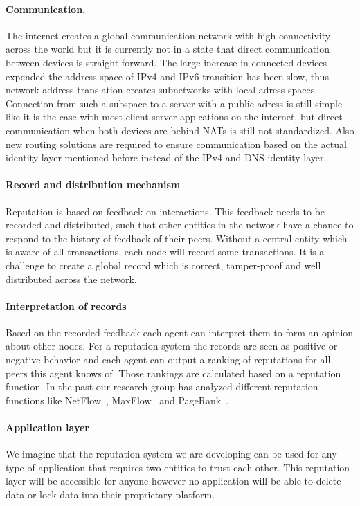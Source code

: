 \paragraph{Communication.} The internet creates a global communication network with high connectivity
across the world but it is currently not in a state that direct communication between devices is 
straight-forward. The large increase in connected devices expended the address space of IPv4 and IPv6
transition has been slow, thus network address translation creates subnetworks with local adress 
spaces. Connection from such a subspace to a server with a public adress is still simple like it is
the case with most client-server applcations on the internet, but direct communication when both 
devices are behind NATs is still not standardized. Also new routing solutions are required to ensure
communication based on the actual identity layer mentioned before instead of the IPv4 and DNS identity
layer.

\paragraph{Record and distribution mechanism} Reputation is based on feedback on interactions. 
This feedback needs to be recorded and distributed, such that other entities in the
network have a chance to respond to the history of feedback of their peers. Without a central entity
which is aware of all transactions, each node will record some transactions. It is a challenge to 
create a global record which is correct, tamper-proof and well distributed across the network.

\paragraph{Interpretation of records} Based on the recorded feedback each agent can interpret them
to form an opinion about other nodes. For a reputation system the records are seen as positive or
negative behavior and each agent can output a ranking of reputations for all peers this agent knows
of. Those rankings are calculated based on a reputation function. In the past our research group has
analyzed different reputation functions like NetFlow~\cite{OTTE2017}, 
MaxFlow~\cite{meulpolder2009bartercast} and PageRank~\cite{page1999pagerank}.

\paragraph{Application layer} We imagine that the reputation system we are developing can be used 
for any type of application that requires two entities to trust each other. This reputation layer 
will be accessible for anyone however no application will be able to delete data or lock data into
their proprietary platform. 

